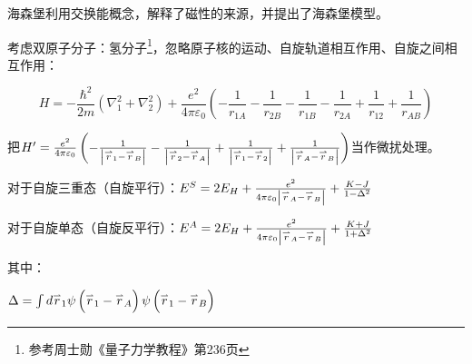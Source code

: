 海森堡利用交换能概念，解释了磁性的来源，并提出了海森堡模型。

考虑双原子分子：氢分子\footnote{参考周士勋《量子力学教程》第236页}，忽略原子核的运动、自旋轨道相互作用、自旋之间相互作用：

\begin{equation}\label{32-3-1}
H = - \frac{\hbar^2}{2m}\left(\nabla_1^2 + \nabla_2^2 \right) + \frac{e^2}{4 \pi \varepsilon_0} \left( - \frac{1}{r_{1A}} - \frac{1}{r_{2B}} - \frac{1}{r_{1B}} - \frac{1}{r_{2A}} +  \frac{1}{r_{12}} +  \frac{1}{r_{AB}} \right)
\end{equation}


把$H' = \frac{{e^2 }}{{4\pi \varepsilon _0 }}\left( { - \frac{1}{{\left| {\mathord{\buildrel{\lower3pt\hbox{$\scriptscriptstyle\rightharpoonup$}}
\over r} _1  - \mathord{\buildrel{\lower3pt\hbox{$\scriptscriptstyle\rightharpoonup$}}
\over r} _B } \right|}} - \frac{1}{{\left| {\mathord{\buildrel{\lower3pt\hbox{$\scriptscriptstyle\rightharpoonup$}}
\over r} _2  - \mathord{\buildrel{\lower3pt\hbox{$\scriptscriptstyle\rightharpoonup$}}
\over r} _A } \right|}} + \frac{1}{{\left| {\mathord{\buildrel{\lower3pt\hbox{$\scriptscriptstyle\rightharpoonup$}}
\over r} _1  - \mathord{\buildrel{\lower3pt\hbox{$\scriptscriptstyle\rightharpoonup$}}
\over r} _2 } \right|}} + \frac{1}{{\left| {\mathord{\buildrel{\lower3pt\hbox{$\scriptscriptstyle\rightharpoonup$}}
\over r} _A  - \mathord{\buildrel{\lower3pt\hbox{$\scriptscriptstyle\rightharpoonup$}}
\over r} _B } \right|}}} \right)$当作微扰处理。


对于自旋三重态（自旋平行）：$E^S  = 2E_H  + \frac{{e^2 }}{{4\pi \varepsilon _0 \left| {\mathord{\buildrel{\lower3pt\hbox{$\scriptscriptstyle\rightharpoonup$}}
\over r} _A  - \mathord{\buildrel{\lower3pt\hbox{$\scriptscriptstyle\rightharpoonup$}}
\over r} _B } \right|}} + \frac{{K - J}}{{1 - \Delta ^2 }}$

对于自旋单态（自旋反平行）：$E^A  = 2E_H  + \frac{{e^2 }}{{4\pi \varepsilon _0 \left| {\mathord{\buildrel{\lower3pt\hbox{$\scriptscriptstyle\rightharpoonup$}}
\over r} _A  - \mathord{\buildrel{\lower3pt\hbox{$\scriptscriptstyle\rightharpoonup$}}
\over r} _B } \right|}} + \frac{{K + J}}{{1 + \Delta ^2 }}$

其中：

$\Delta  = \int {d\mathord{\buildrel{\lower3pt\hbox{$\scriptscriptstyle\rightharpoonup$}}
\over r} _1 \psi \left( {\mathord{\buildrel{\lower3pt\hbox{$\scriptscriptstyle\rightharpoonup$}}
\over r} _1  - \mathord{\buildrel{\lower3pt\hbox{$\scriptscriptstyle\rightharpoonup$}}
\over r} _A } \right)\psi \left( {\mathord{\buildrel{\lower3pt\hbox{$\scriptscriptstyle\rightharpoonup$}}
\over r} _1  - \mathord{\buildrel{\lower3pt\hbox{$\scriptscriptstyle\rightharpoonup$}}
\over r} _B } \right)} $

